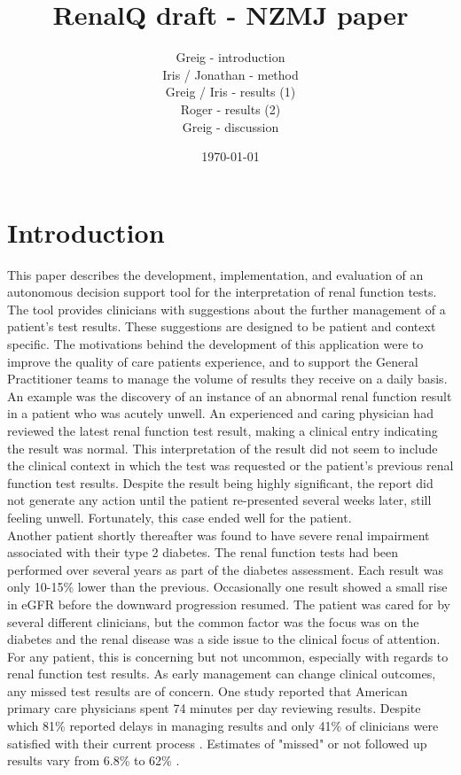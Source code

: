 ﻿\documentclass[11pt]{article}
\title{\textbf{RenalQ draft - NZMJ paper}}
\author{Greig - introduction\\
		Iris / Jonathan - method\\
		Greig / Iris - results (1)\\
		Roger - results (2)\\
		Greig - discussion}
\date{\today}
\begin{document}
\maketitle


\section{Introduction}

This paper describes the development, implementation, and evaluation  of an autonomous decision support tool for the interpretation of renal function tests. The tool provides clinicians with suggestions about the further management of a patient's test results. These suggestions are designed to be patient and context specific. The motivations behind the development of this application were to improve the quality of care patients experience, and to support the General Practitioner teams to manage the volume of results they receive on a daily basis. \\

An example was the discovery of an instance of an abnormal renal function result in a patient who was acutely unwell. An experienced and caring physician had reviewed the latest renal function test result, making a clinical entry indicating the result was normal. This interpretation of the result did not seem to include the clinical context in which the test was requested or the patient's previous renal function test results. Despite the result being highly significant, the report did not generate any action until the patient re-presented several weeks later, still feeling unwell. Fortunately, this case ended well for the patient.\\

Another patient shortly thereafter was found to have severe renal impairment associated with their type 2 diabetes. The renal function tests had been performed over several years as part of the diabetes assessment. Each result was only 10-15\% lower than the previous. Occasionally one result showed a small rise in eGFR before the downward progression resumed. The patient was cared for by several different clinicians, but the common factor was the focus was on the diabetes and the renal disease was a side issue to the clinical focus of attention.\\

For any patient, this is concerning but not uncommon, especially with regards to renal function test results.  As early management can change clinical outcomes, any missed test results are of concern. One study reported that American primary care physicians spent 74 minutes per day reviewing results. Despite which 81\% reported delays in managing results and only 41\% of clinicians were satisfied with their current process \citep{poon2004wish}. Estimates of "missed" or not followed up results vary from 6.8\% to 62\% \citep{callen2012failure}.\\
\end{document}
